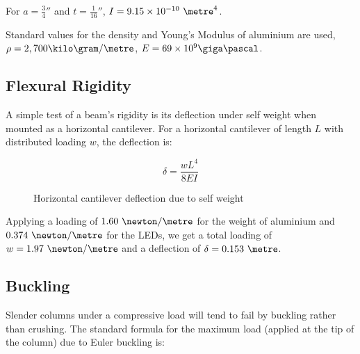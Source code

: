 \documentclass[12pt]{article} %
\begin{document}
\begin{appendices}
For $a=\frac{3}{4}''$ and $t=\frac{1}{16}''$,
$I = 9.15\times10^{-10}~\metre^4$.

Standard values for the density and Young's Modulus of aluminium are used,
$\rho=2,700\kilo\gram/\metre$, $E = 69 \times 10^9 \giga\pascal$.

\subsection{Flexural Rigidity}
A simple test of a beam's rigidity is its deflection under self weight when
mounted as a horizontal cantilever.  For a horizontal cantilever of length $L$
with distributed loading $w$, the deflection is:

\begin{equation}
\delta = \frac{w L^4}{8EI}
\label{eq:cantilever}
\end{equation}

\begin{figure}[h]
    \centering
    \caption{Horizontal cantilever deflection due to self weight}
\end{figure}

Applying a loading of $1.60~\newton/\metre$ for the weight of aluminium and
$0.374~\newton/\metre$ for the LEDs, we get a total loading of
$w=1.97~\newton/\metre$ and a deflection of $\delta = 0.153~\metre$.

\subsection{Buckling}
Slender columns under a compressive load will tend to fail by buckling rather
than crushing.  The standard formula for the maximum load (applied at the tip
of the column) due to Euler buckling is:


\end{appendices}
\end{document}
